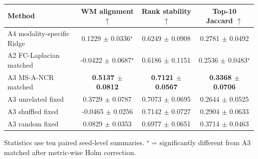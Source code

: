 \begin{tabular}{lccc}
\toprule
Method & WM alignment $\uparrow$ & Rank stability $\uparrow$ & Top-10 Jaccard $\uparrow$ \\
\midrule
A4 modality-specific Ridge & 0.1229 $\pm$ 0.0336$^{\star}$ & 0.6249 $\pm$ 0.0908 & 0.2781 $\pm$ 0.0492 \\
A2 FC-Laplacian matched & -0.0422 $\pm$ 0.0687$^{\star}$ & 0.6186 $\pm$ 0.1151 & 0.2536 $\pm$ 0.0483$^{\star}$ \\
A3 MS-A-NCR matched & \textbf{0.5137 $\pm$ 0.0812} & \textbf{0.7121 $\pm$ 0.0567} & \textbf{0.3368 $\pm$ 0.0706} \\
A3 unrelated fixed & 0.3729 $\pm$ 0.0787 & 0.7073 $\pm$ 0.0695 & 0.2644 $\pm$ 0.0525 \\
A3 shuffled fixed & -0.0465 $\pm$ 0.0256 & 0.7142 $\pm$ 0.0727 & 0.2904 $\pm$ 0.0633 \\
A3 random fixed & 0.0829 $\pm$ 0.0353 & 0.6977 $\pm$ 0.0651 & 0.3714 $\pm$ 0.0463 \\
\bottomrule
\end{tabular}

Statistics use ten paired seed-level summaries.  $^{\star}$ = significantly different from A3 matched after metric-wise Holm correction.